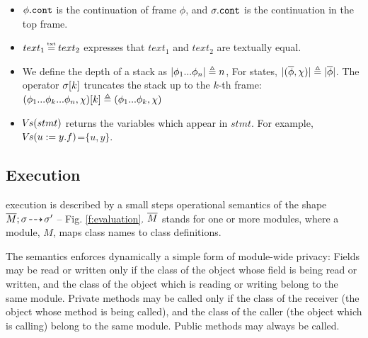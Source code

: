 {\begin{itemize}
Thus,   $\sigma[\overline{x \mapsto \alpha}]$ and $A[ \overline{e/y}]$ 
have the expected meaning.
\item
$\phi.\mbox{\normalfont{\texttt{cont}}}$ is the continuation of frame $\phi$, and  $\sigma.\mbox{\normalfont{\texttt{cont}}}$ is the continuation in the top frame.
\item
$text_1 \txteq text_2$ expresses that $text_1$ and $text_2$ are textually equal.
\item
We define the depth of a stack as $|\phi_1...\phi_n| \triangleq n$, For states, $|(\overline \phi, \chi)| \triangleq  |\overline \phi|$.
The  operator $\sigma[k]$ truncates the stack up to the $k$-th frame: %
 $(\phi_1...\phi_k...\phi_n,\chi)[k]  \triangleq   (\phi_1...\phi_k,\chi)$
\item
{ ${\hspace{-1pt}V\hspace{-1pt}}s(stmt)$ returns the variables which appear in $stmt$. For example, ${\hspace{-1pt}V\hspace{-1pt}}s(u:=y.f)$=$\{u,y\}$.}
\end{itemize}

  

  
\subsection{\LangOO Execution}
\label{sect:execution}

 \LangOO execution is described by a small steps operational semantics of the shape $\overline{M};\sigma\! \dashrightarrow\! {\sigma'}$ 
 -- {\cf Fig. \ref{f:evaluation}.} 
  $\overline{M}$ stands for one or more modules, where a
  module,  $M$, maps class names to class definitions. 
   
{The semantics enforces dynamically a simple form of module-wide privacy: 
Fields may be read or written only if the class of the object whose field is being read or written, and the class of the object which is reading or writing belong to the same module.}
Private methods may be called only if the class of the receiver (the object whose method is being called), and the class of the caller (the object which is calling) belong to the same module.
Public methods may always be called.

}
